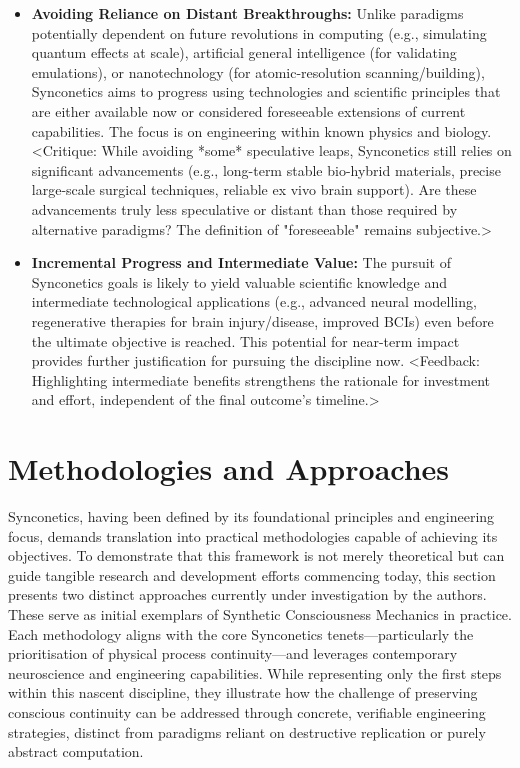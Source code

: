 \documentclass[10pt]{article}
\begin{document}
\begin{sloppypar}
\begin{itemize}
    \item \textbf{Avoiding Reliance on Distant Breakthroughs:} Unlike paradigms potentially dependent on future revolutions in computing (e.g., simulating quantum effects at scale), artificial general intelligence (for validating emulations), or nanotechnology (for atomic-resolution scanning/building), Synconetics aims to progress using technologies and scientific principles that are either available now or considered foreseeable extensions of current capabilities. The focus is on engineering within known physics and biology. <Critique: While avoiding *some* speculative leaps, Synconetics still relies on significant advancements (e.g., long-term stable bio-hybrid materials, precise large-scale surgical techniques, reliable ex vivo brain support). Are these advancements truly less speculative or distant than those required by alternative paradigms? The definition of "foreseeable" remains subjective.>

    \item \textbf{Incremental Progress and Intermediate Value:} The pursuit of Synconetics goals is likely to yield valuable scientific knowledge and intermediate technological applications (e.g., advanced neural modelling, regenerative therapies for brain injury/disease, improved BCIs) even before the ultimate objective is reached. This potential for near-term impact provides further justification for pursuing the discipline now. <Feedback: Highlighting intermediate benefits strengthens the rationale for investment and effort, independent of the final outcome's timeline.>

  \end{itemize}

  \section{Methodologies and Approaches}
  \label{sec:methodologies}

  Synconetics, having been defined by its foundational principles and engineering focus, demands translation into practical methodologies capable of achieving its objectives. To demonstrate that this framework is not merely theoretical but can guide tangible research and development efforts commencing today, this section presents two distinct approaches currently under investigation by the authors. These serve as initial exemplars of Synthetic Consciousness Mechanics in practice. Each methodology aligns with the core Synconetics tenets—particularly the prioritisation of physical process continuity—and leverages contemporary neuroscience and engineering capabilities. While representing only the first steps within this nascent discipline, they illustrate how the challenge of preserving conscious continuity can be addressed through concrete, verifiable engineering strategies, distinct from paradigms reliant on destructive replication or purely abstract computation.


\end{sloppypar}
\end{document}

